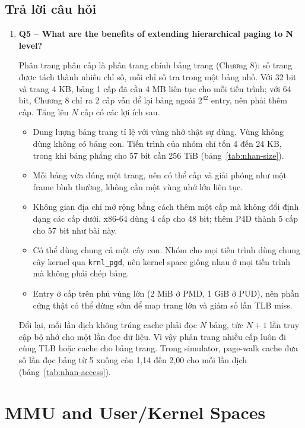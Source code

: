 \documentclass[12pt,a4paper]{article}
\begin{document}
	\subsection{Trả lời câu hỏi}
	\begin{enumerate}
	    \item \textbf{Q5 -- What are the benefits of extending hierarchical paging to N level?}

	    Phân trang phân cấp là phân trang chính bảng trang (Chương 8): số trang được tách thành nhiều chỉ số, mỗi chỉ số tra trong một bảng nhỏ. Với 32 bit và trang 4 KB, bảng 1 cấp đã cần 4 MB liên tục cho mỗi tiến trình; với 64 bit, Chương 8 chỉ ra 2 cấp vẫn để lại bảng ngoài \(2^{42}\) entry, nên phải thêm cấp. Tăng lên \(N\) cấp có các lợi ích sau.
	    \begin{itemize}
	        \item Dung lượng bảng trang tỉ lệ với vùng nhớ thật sự dùng. Vùng không dùng không có bảng con. Tiến trình của nhóm chỉ tốn 4 đến 24 KB, trong khi bảng phẳng cho 57 bit cần 256 TiB (bảng~\ref{tab:nhan-size}).
	        \item Mỗi bảng vừa đúng một trang, nên có thể cấp và giải phóng như một frame bình thường, không cần một vùng nhớ lớn liên tục.
	        \item Không gian địa chỉ mở rộng bằng cách thêm một cấp mà không đổi định dạng các cấp dưới. x86-64 dùng 4 cấp cho 48 bit; thêm P4D thành 5 cấp cho 57 bit như bài này.
	        \item Có thể dùng chung cả một cây con. Nhóm cho mọi tiến trình dùng chung cây kernel qua \texttt{krnl\_pgd}, nên kernel space giống nhau ở mọi tiến trình mà không phải chép bảng.
	        \item Entry ở cấp trên phủ vùng lớn (2 MiB ở PMD, 1 GiB ở PUD), nên phần cứng thật có thể dừng sớm để map trang lớn và giảm số lần TLB miss.
	    \end{itemize}
	    Đổi lại, mỗi lần dịch không trúng cache phải đọc \(N\) bảng, tức \(N+1\) lần truy cập bộ nhớ cho một lần đọc dữ liệu. Vì vậy phân trang nhiều cấp luôn đi cùng TLB hoặc cache cho bảng trang. Trong simulator, page-walk cache đưa số lần đọc bảng từ 5 xuống còn 1,14 đến 2,00 cho mỗi lần dịch (bảng~\ref{tab:nhan-access}).
	\end{enumerate}

	\begingroup
	\sloppy
	\section{MMU and User/Kernel Spaces}
\end{document}
